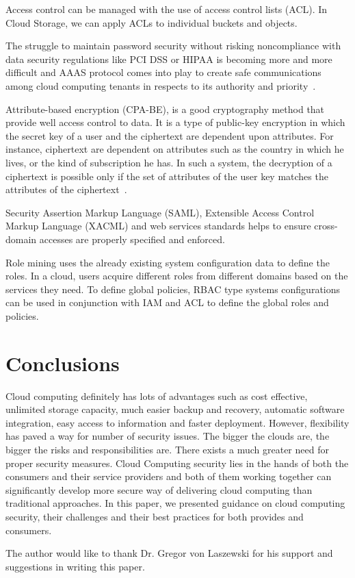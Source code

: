 Access control can be managed with the use of access control 
lists (ACL). In Cloud Storage, we can apply ACLs to individual
buckets and objects.

The struggle to maintain password security without risking 
noncompliance with data security regulations like PCI DSS 
or HIPAA is becoming more and more difficult and AAAS protocol
comes into play to create safe communications among cloud 
computing tenants in respects to its authority
and priority~\cite{hid-sp18-513-poland}. 

Attribute-based encryption (CPA-BE), is a good cryptography 
method that provide well access control to data. It is a type of 
public-key encryption in which the secret key of a user and the 
ciphertext are dependent upon attributes. For instance, ciphertext
are dependent on attributes such as the country in which he lives,
or the kind of subscription he has. In such a system, the decryption
of a ciphertext is possible only if the set of attributes of the user
key matches the attributes of the ciphertext~\cite{hid-sp18-513-poland}.

Security Assertion Markup Language (SAML), Extensible Access Control
Markup Language (XACML) and web services standards helps to ensure
cross-domain accesses are properly specified and enforced.

Role mining uses the already existing system configuration data to
define the roles. In a cloud, users acquire different roles from
different domains based on the services they need. To define global 
policies, RBAC type systems configurations can be used in conjunction
with IAM and ACL to define the global roles and policies.

\section{Conclusions}
Cloud computing definitely has lots of advantages such as cost effective, 
unlimited storage capacity, much easier backup and recovery, automatic
software integration, easy access to information and faster deployment. 
However, flexibility has paved a way for number of security issues.
The bigger the clouds are, the bigger the risks and responsibilities are. 
There exists a much greater need for proper security measures.
Cloud Computing security lies in the hands of both the consumers and their
service providers and both of them working together can significantly 
develop more secure way of delivering cloud computing than traditional 
approaches. In this paper, we presented guidance on cloud computing security,
their challenges and their best practices for both provides and consumers.

\begin{acks}
The author would like to thank Dr. Gregor von Laszewski for his support and 
suggestions in writing this paper.
\end{acks}


 
